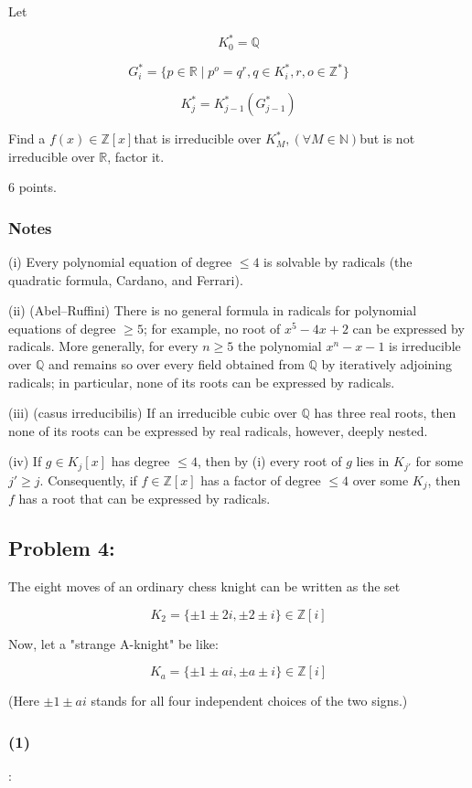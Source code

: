 \documentclass{article}
\begin{document}
Let 

$$K^*_0=\mathbb{Q}$$

$$G^*_i=\{p\in \mathbb{R}\mid p^o=q^r,q\in K^*_i,r,o\in \mathbb{Z}^*\}$$

$$K^*_j=K^*_{j-1}(G^*_{j-1})$$

Find a $f(x) \in \mathbb{Z}[x]$that is irreducible over $K^*_M,(\forall M \in \mathbb{N})$but is not irreducible over $\mathbb{R}$, factor it.

6 points.

\subsubsection*{Notes}

(i) Every polynomial equation of degree $\le4$ is solvable by
radicals (the quadratic formula, Cardano, and Ferrari).

(ii) (Abel--Ruffini) There is no general formula in radicals for 
polynomial equations of degree $\ge5$; for example, no root
of $x^5-4x+2$ can be expressed by radicals. More generally,
for every $n\ge5$ the polynomial $x^n-x-1$ is irreducible over
$\mathbb{Q}$ and remains so over every field obtained from
$\mathbb{Q}$ by iteratively adjoining radicals; in particular,
none of its roots can be expressed by radicals.

(iii) (casus irreducibilis) If an irreducible cubic over
$\mathbb{Q}$ has three real roots, then none of its roots can
be expressed by real radicals, however, deeply nested.

(iv) If $g\in K_j[x]$ has degree $\le 4$, then by (i) every root
of $g$ lies in $K_{j'}$ for some $j'\ge j$. Consequently, if
$f\in\mathbb{Z}[x]$ has a factor of degree $\le4$ over some $K_j$,
then $f$ has a root that can be expressed by radicals.

\subsection{Problem 4:}

The eight moves of an ordinary chess knight can be written as the set

$$K_2=\{\pm1\pm 2i,\pm 2 \pm i\}\in\mathbb{Z}[i]$$

Now, let a "strange A-knight" be like:

$$K_a=\{\pm1\pm ai,\pm a \pm i\}\in\mathbb{Z}[i]$$

(Here $\pm1\pm ai$ stands for all four independent choices of the two signs.)

\subsubsection{(1)}:
\end{document}
